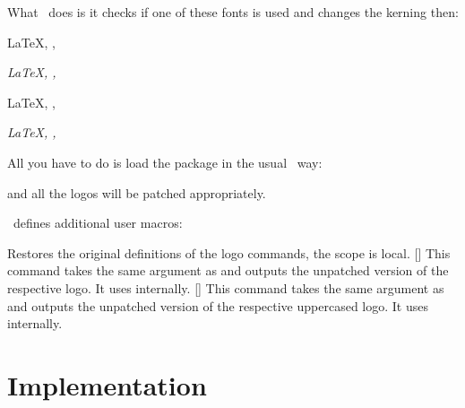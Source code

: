 \documentclass[load-preamble+]{cnltx-doc}
\begin{document}
What \libertinehologopatch\ does is it checks if one of these fonts is used
and changes the kerning then:

\begin{example}
  \huge
  \LaTeX, \XeLaTeX, \LaTeXTeX \par
  \textit{\LaTeX, \XeLaTeX, \LaTeXTeX}
 
  \sffamily
  \LaTeX, \XeLaTeX, \LaTeXTeX \par
  \textit{\LaTeX, \XeLaTeX, \LaTeXTeX}
\end{example}

All you have to do is load the package in the usual \LaTeXe\ way:
\begin{sourcecode}
  \usepackage{libertinehologopatch}
\end{sourcecode}
and all the logos will be patched appropriately.

\libertinehologopatch\ defines additional user macros:
\begin{commands}
    Restores the original definitions of the logo commands, the scope is
    local.
  []
    This command takes the same argument as  and outputs the
    unpatched version of the respective logo. It uses 
    internally.
  []
    This command takes the same argument as  and outputs the
    unpatched version of the respective uppercased logo. It uses
     internally.
\end{commands}

\section{Implementation}

\cleardoublepage
\end{document}

